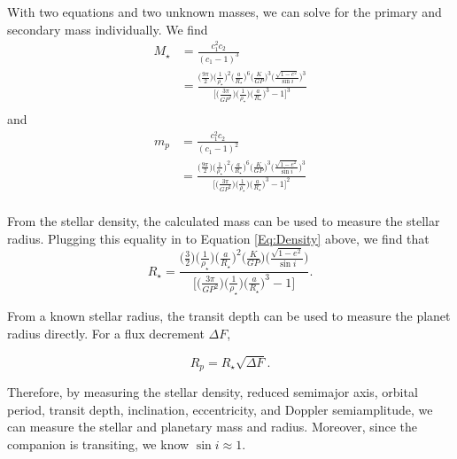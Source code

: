With two equations and two unknown masses, we can solve for the primary and secondary mass individually. We find
\begin{align}
M_\star &= \frac{c_1^2 c_2}{(c_1-1)^3}  \nonumber \\
        &= \frac{\bigg(\frac{9\pi}{2}\bigg)\bigg(\frac{1}{\rho_\star}\bigg)^2\bigg(\frac{a}{R_\star}\bigg)^6\bigg(\frac{K}{GP}\bigg)^3\bigg(\frac{\sqrt{1-e^2}}{\sin{i}}\bigg)^3}{\bigg[\bigg(\frac{3\pi}{GP^2}\bigg) \bigg(\frac{1}{\rho_\star}\bigg) \bigg(\frac{a}{R_\star}\bigg)^3-1\bigg]^3} \\
\end{align}
and
\begin{align}
m_p     &= \frac{c_1^2 c_2}{(c_1-1)^2}  \nonumber \\
        &= \frac{\bigg(\frac{9\pi}{2}\bigg)\bigg(\frac{1}{\rho_\star}\bigg)^2\bigg(\frac{a}{R_\star}\bigg)^6\bigg(\frac{K}{GP}\bigg)^3\bigg(\frac{\sqrt{1-e^2}}{\sin{i}}\bigg)^3}{\bigg[\bigg(\frac{3\pi}{GP^2}\bigg) \bigg(\frac{1}{\rho_\star}\bigg) \bigg(\frac{a}{R_\star}\bigg)^3-1\bigg]^2} \\
\end{align}


From the stellar density, the calculated mass can be used to measure the stellar radius. 
Plugging this equality in to Equation \ref{Eq:Density} above, we find that
\begin{equation}
R_\star = \frac{\bigg(\frac{3}{2}\bigg)\bigg(\frac{1}{\rho_\star}\bigg)\bigg(\frac{a}{R_\star}\bigg)^2\bigg(\frac{K}{GP}\bigg)\bigg(\frac{\sqrt{1-e^2}}{\sin{i}}\bigg)}{\bigg[\bigg(\frac{3\pi}{GP^2}\bigg) \bigg(\frac{1}{\rho_\star}\bigg) \bigg(\frac{a}{R_\star}\bigg)^3-1\bigg]}.
\end{equation}

From a known stellar radius, the transit depth can be used to measure the planet radius directly. For a flux decrement $\Delta F$, 

\begin{equation}
R_p = R_\star\sqrt{\Delta F}.
\end{equation}

Therefore, by measuring the stellar density, reduced semimajor axis, orbital period, transit depth, inclination, eccentricity, and Doppler semiamplitude, we can measure the stellar and planetary mass and radius. 
Moreover, since the companion is transiting, we know $\sin i \approx 1$. 

